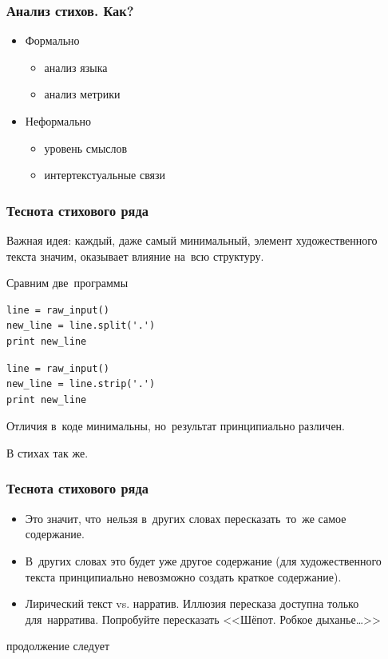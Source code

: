 \documentclass{beamer}
\begin{document}

\begin{frame}
\frametitle{Анализ стихов. Как?}


\begin{itemize}
\item Формально
\begin{itemize}
\item анализ языка
\item анализ метрики
\end{itemize} 
\item Неформально
\begin{itemize}
\item уровень смыслов
\item интертекстуальные связи
\end{itemize} 
\end{itemize}

\end{frame}


\begin{frame}[fragile]
\frametitle{Теснота стихового ряда}



Важная идея: каждый, даже самый минимальный, элемент художественного текста значим, оказывает влияние на~всю структуру.

Сравним две~программы

\begin{lstlisting}[label=example-code,caption=Первая программа]
line = raw_input()
new_line = line.split('.')
print new_line
\end{lstlisting}

\begin{lstlisting}[label=example-code2,caption=Вторая программа]
line = raw_input()
new_line = line.strip('.')
print new_line
\end{lstlisting}

Отличия в~коде минимальны, но~результат принципиально различен.

В стихах так же.

\end{frame}




\begin{frame}
\frametitle{Теснота стихового ряда}

\begin{itemize}
\item Это значит, что~нельзя в~других словах пересказать~то~же самое содержание.
\item В~других словах это будет уже другое содержание (для художественного текста принципиально невозможно создать краткое содержание).
\item Лирический текст vs. нарратив. Иллюзия пересказа доступна только для~нарратива. Попробуйте пересказать <<Шёпот. Робкое дыханье\dots>>
\end{itemize}



\end{frame}



\begin{frame}
\Huge{\centerline{продолжение следует}}
\end{frame}

\end{document}

